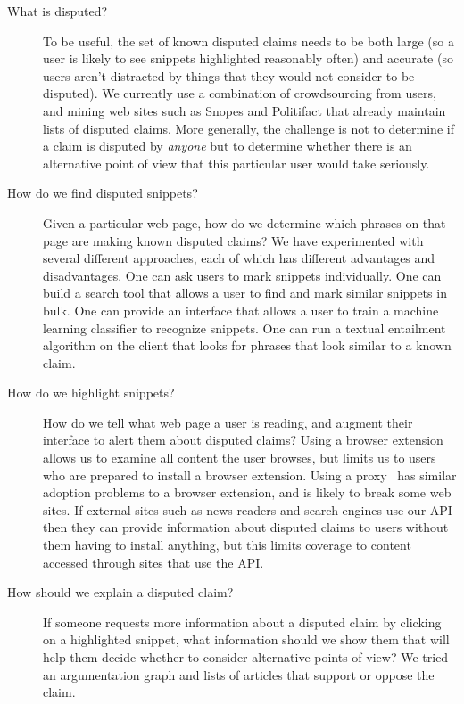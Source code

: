 \documentclass{www2010-submission}
\begin{document}
\begin{description}
\item[What is disputed?] To be useful, the set of known disputed claims needs to be both large (so a user is likely to see snippets highlighted reasonably often) and accurate (so users aren't distracted by things that they would not consider to be disputed). We currently use a combination of crowdsourcing from users, and mining web sites such as Snopes and Politifact that already maintain lists of disputed claims. More generally, the challenge is not to determine if a claim is disputed by {\it anyone} but to determine whether there is an alternative point of view that this particular user would take seriously.

\item[How do we find disputed snippets?] Given a particular web page, how do we determine which phrases on that page are making known disputed claims? We have experimented with several different approaches, each of which has different advantages and disadvantages. One can ask users to mark snippets individually. One can build a search tool that allows a user to find and mark similar snippets in bulk. One can provide an interface that allows a user to train a machine learning classifier to recognize snippets. One can run a textual entailment algorithm on the client that looks for phrases that look similar to a known claim. 

\item[How do we highlight snippets?] How do we tell what web page a user is reading, and augment their interface to alert them about disputed claims? Using a browser extension allows us to examine all content the user browses, but limits us to users who are prepared to install a browser extension. Using a proxy~\cite{Barrett1997} has similar adoption problems to a browser extension, and is likely to break some web sites. If external sites such as news readers and search engines use our API then they can provide information about disputed claims to users without them having to install anything, but this limits coverage to content accessed through sites that use the API.

\item[How should we explain a disputed claim?] If someone requests more information about a disputed claim by clicking on a highlighted snippet, what information should we show them that will help them decide whether to consider alternative points of view? We tried an argumentation graph and lists of articles that support or oppose the claim.
\end{description}
\end{document}
